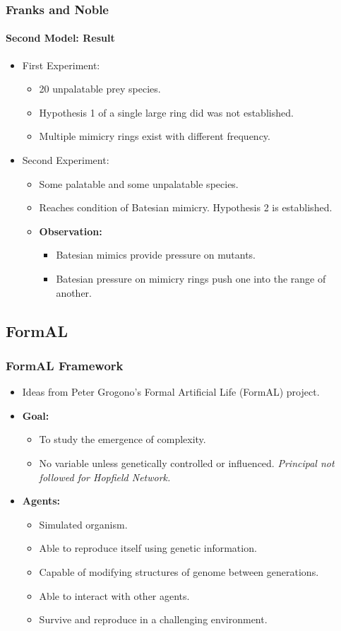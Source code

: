 \frame
{
	\frametitle{Franks and Noble}
	\framesubtitle{Second Model: Result}

	\begin{itemize}
		\item First Experiment:
			\begin{itemize}
				\item 20 unpalatable prey species.
				\item Hypothesis 1 of a single large ring did was not established.
				\item Multiple mimicry rings exist with different frequency.
			\end{itemize}
		\item Second Experiment:
			\begin{itemize}
				\item Some palatable and some unpalatable species.
				\item Reaches condition of Batesian mimicry. Hypothesis 2 is established.
				\item \textbf{Observation:}
					\begin{itemize}
						\item Batesian mimics provide pressure on mutants.
						\item Batesian pressure on mimicry rings push one into the range of another.
					\end{itemize}
			\end{itemize}
	\end{itemize}
}

\subsection{FormAL}

\frame
{
	\frametitle{FormAL Framework}
	
	\begin{itemize}
		\item Ideas from Peter Grogono's Formal Artificial Life (FormAL) project.
		\item \textbf{Goal:}		
			\begin{itemize}
				\item To study the emergence of complexity.
				\item No variable unless genetically controlled or influenced. \textit{Principal not followed for Hopfield Network.}
			\end{itemize}
		\item \textbf{Agents:}
			\begin{itemize}
				\item Simulated organism.
				\item Able to reproduce itself using genetic information.
				\item Capable of modifying structures of genome between generations.
				\item Able to interact with other agents.
				\item Survive and reproduce in a challenging environment.
			\end{itemize}
	\end{itemize}
	
}

